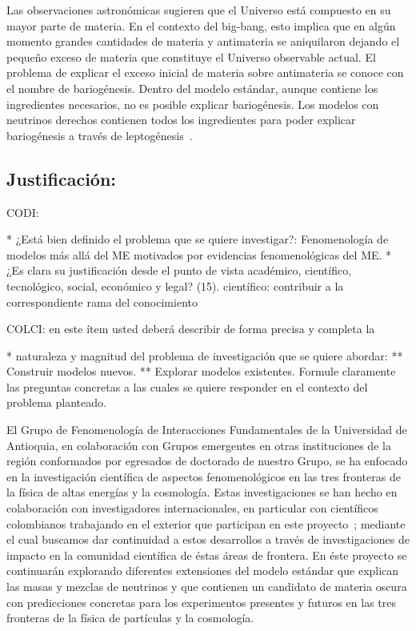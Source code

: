 Las observaciones astronómicas sugieren que el Universo está compuesto
en su mayor parte de materia. En el contexto del big-bang, esto
implica que en algún momento grandes cantidades de materia y
antimateria se aniquilaron dejando el pequeño exceso de materia que
constituye el Universo observable actual. El problema de explicar el
exceso inicial de materia sobre antimateria se conoce con el nombre de
bariogénesis. Dentro del modelo estándar, aunque contiene los
ingredientes necesarios, no es posible explicar bariogénesis. Los
modelos con neutrinos derechos contienen todos los ingredientes para
poder explicar bariogénesis a través de leptogénesis~\cite{}.




\subsection{Justificación:                                 }
\begin{instrucciones}
  CODI: 

  * ¿Está bien definido el problema que se quiere investigar?:
  Fenomenología de modelos más allá del ME motivados por evidencias
  fenomenológicas del ME.  
  * ¿Es clara su justificación desde el punto de vista académico,
  científico, tecnológico, social, económico y legal? (15).
  científico: contribuir a la correspondiente rama del conocimiento

  COLCI: en este ítem usted deberá describir de forma precisa y completa la
  
  * naturaleza y magnitud del problema de investigación que se quiere
  abordar:
  ** Construir modelos nuevos.
  ** Explorar modelos existentes.
  Formule claramente las preguntas concretas a las cuales se
  quiere responder en el contexto del problema planteado.
\end{instrucciones}
El Grupo de Fenomenología de Interacciones Fundamentales de la
Universidad de Antioquia, en colaboración con Grupos emergentes en
otras instituciones de la región conformados por egresados de
doctorado de nuestro Grupo, se ha enfocado en la investigación
científica de aspectos fenomenológicos en las tres fronteras de la
física de altas energías y la cosmología. Estas investigaciones se han
hecho en colaboración con investigadores internacionales, en
particular con científicos colombianos trabajando en el exterior que
participan en este
proyecto~\cite{Sierra:2009zq,Sierra:2008wj,AristizabalSierra:2008ye,Choi:2010jt,AristizabalSierra:2009bh};
mediante el cual buscamos dar continuidad a estos desarrollos a través
de investigaciones de impacto en la comunidad científica de éstas
áreas de frontera. En éste proyecto se continuarán explorando
diferentes extensiones del modelo estándar que explican las masas y
mezclas de neutrinos y que contienen un candidato de materia oscura
con predicciones concretas para los experimentos presentes y futuros
en las tres fronteras de la física de partículas y la cosmología.


